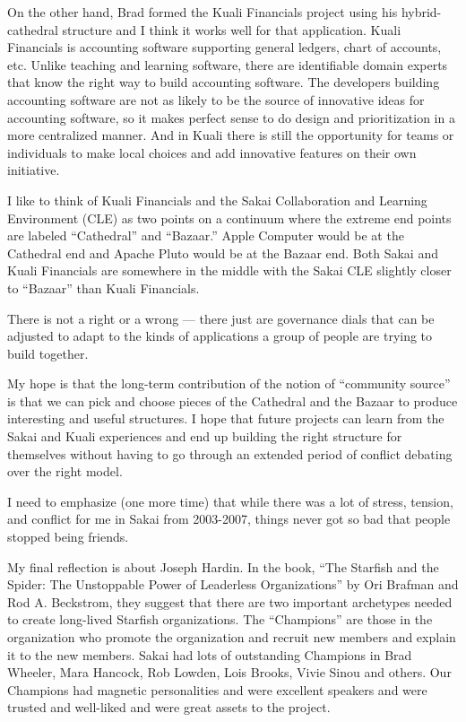 \documentclass[12pt]{book}
\begin{document}
On the other hand, Brad formed the Kuali Financials project using his hybrid-cathedral
structure and I think it works well for that application.  Kuali Financials is
accounting software supporting general ledgers, chart of accounts, etc.  Unlike
teaching and learning software, there are identifiable domain experts that
know the right way to build accounting software.  The developers
building accounting software are not as likely
to be the source of innovative ideas for accounting software, so it makes perfect sense
to do design and prioritization in a more centralized manner.  And in Kuali there is
still the opportunity for teams or individuals to make local choices and add innovative
features on their own initiative.

I like to think of Kuali Financials and the Sakai Collaboration and Learning Environment (CLE)
as two points on a continuum where
the extreme end points are labeled ``Cathedral'' and ``Bazaar.''  Apple Computer
would be at the Cathedral end and Apache Pluto would be at the Bazaar end.
Both Sakai and Kuali Financials are somewhere in the middle with
the Sakai CLE slightly
closer to ``Bazaar'' than Kuali Financials.

There is not a right or a wrong --- there just are governance dials that
can be adjusted to adapt to the kinds of applications a group of people
are trying to build together.

My hope is that the long-term contribution of the notion of ``community source'' is that
we can pick and choose pieces of the Cathedral and the Bazaar to produce interesting and
useful structures.   I hope that future projects can learn from the Sakai
and Kuali experiences and end up building the right structure for themselves
without having to go through an extended period of conflict debating over
the right model.

I need to emphasize (one more time) that while there was a lot of stress,
tension, and conflict for me in Sakai from 2003-2007, things never got
so bad that people stopped being friends.

My final reflection is about Joseph Hardin.  In the book,
``The Starfish and the Spider: The Unstoppable Power of Leaderless
Organizations'' by Ori Brafman and Rod A. Beckstrom, they suggest
that there are two important archetypes needed to create long-lived Starfish
organizations.  The ``Champions'' are those in the organization who
promote the organization and recruit new members and explain it to
the new members.  Sakai had lots of outstanding Champions in Brad
Wheeler, Mara Hancock, Rob Lowden, Lois Brooks, Vivie Sinou and others.  Our
Champions had magnetic personalities and were excellent speakers
and were trusted and well-liked and were great assets to
the project.
\end{document}
